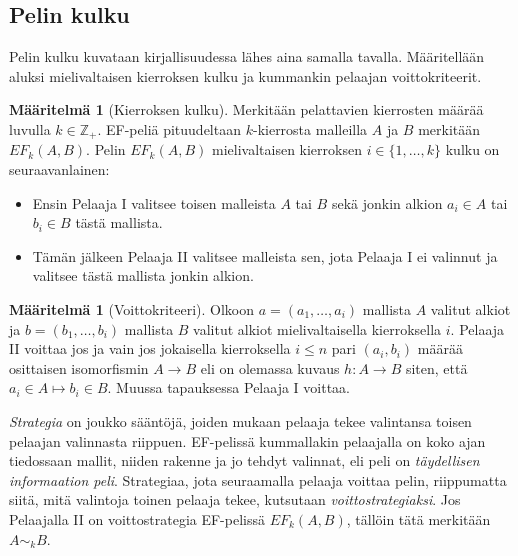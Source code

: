 \documentclass[finnish]{tktltiki2}
\theoremstyle{definition}
\newtheorem{maar}[lau]{Määritelmä}
\theoremstyle{remark}
\begin{document}
\subsection{Pelin kulku}
Pelin kulku kuvataan kirjallisuudessa lähes aina samalla tavalla. Määritellään aluksi mielivaltaisen kierroksen kulku ja kummankin pelaajan voittokriteerit.

\begin{maar}[Kierroksen kulku]
Merkitään pelattavien kierrosten määrää luvulla $k \in \mathbb{Z}_+$. EF-peliä pituudeltaan $k$-kierrosta malleilla $A$ ja $B$ merkitään $EF_k(A, B)$. Pelin $EF_k(A, B)$ mielivaltaisen kierroksen $i \in \{1, \ldots, k\}$ kulku on seuraavanlainen: 
\begin{itemize}
\item Ensin Pelaaja I valitsee toisen malleista $A$ tai $B$ sekä jonkin alkion $a_i \in A$ tai $b_i \in B$ tästä mallista.
\item Tämän jälkeen Pelaaja II valitsee malleista sen, jota Pelaaja I ei valinnut ja valitsee tästä mallista jonkin alkion.
\end{itemize}
\end{maar}

\begin{maar}[Voittokriteeri]
Olkoon $a = (a_1, \ldots, a_i)$ mallista $A$ valitut alkiot ja $b = (b_1, \ldots, b_i)$ mallista $B$ valitut alkiot mielivaltaisella kierroksella $i$. Pelaaja II voittaa jos ja vain jos jokaisella kierroksella $i \leq n$ pari $(a_i, b_i)$ määrää osittaisen isomorfismin $A \rightarrow B$ eli on olemassa kuvaus $h: A \rightarrow B$ siten, että $a_i \in A \mapsto b_i \in B$. Muussa tapauksessa Pelaaja I voittaa.
\end{maar}

\textit{Strategia} on joukko sääntöjä, joiden mukaan pelaaja tekee valintansa toisen pelaajan valinnasta riippuen. EF-pelissä kummallakin pelaajalla on koko ajan tiedossaan mallit, niiden rakenne ja jo tehdyt valinnat, eli peli on \textit{täydellisen informaation peli}. Strategiaa, jota seuraamalla pelaaja voittaa pelin, riippumatta siitä, mitä valintoja toinen pelaaja tekee, kutsutaan \textit{voittostrategiaksi}. Jos Pelaajalla II on voittostrategia EF-pelissä $EF_k(A, B)$, tällöin tätä merkitään $A \sim_k B$.
\end{document}
